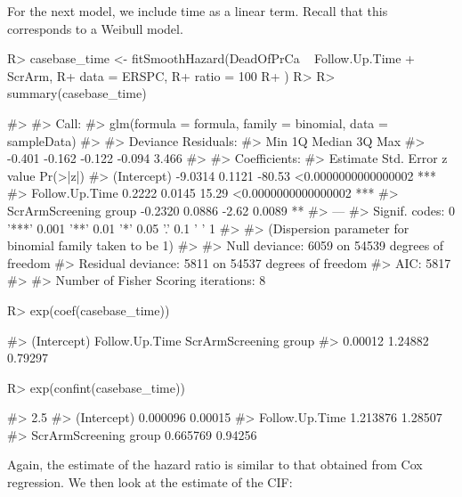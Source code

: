 \documentclass[
]{jss}
\begin{document}
For the next model, we include time as a linear term. Recall that this
corresponds to a Weibull model.

\begin{CodeChunk}

\begin{CodeInput}
R> casebase_time <- fitSmoothHazard(DeadOfPrCa ~ Follow.Up.Time + ScrArm,
R+   data = ERSPC,
R+   ratio = 100
R+ )
R> 
R> summary(casebase_time)
\end{CodeInput}

\begin{CodeOutput}
#> 
#> Call:
#> glm(formula = formula, family = binomial, data = sampleData)
#> 
#> Deviance Residuals: 
#>    Min      1Q  Median      3Q     Max  
#> -0.401  -0.162  -0.122  -0.094   3.466  
#> 
#> Coefficients:
#>                       Estimate Std. Error z value            Pr(>|z|)    
#> (Intercept)            -9.0314     0.1121  -80.53 <0.0000000000000002 ***
#> Follow.Up.Time          0.2222     0.0145   15.29 <0.0000000000000002 ***
#> ScrArmScreening group  -0.2320     0.0886   -2.62              0.0089 ** 
#> ---
#> Signif. codes:  0 '***' 0.001 '**' 0.01 '*' 0.05 '.' 0.1 ' ' 1
#> 
#> (Dispersion parameter for binomial family taken to be 1)
#> 
#>     Null deviance: 6059  on 54539  degrees of freedom
#> Residual deviance: 5811  on 54537  degrees of freedom
#> AIC: 5817
#> 
#> Number of Fisher Scoring iterations: 8
\end{CodeOutput}

\begin{CodeInput}
R> exp(coef(casebase_time))
\end{CodeInput}

\begin{CodeOutput}
#>           (Intercept)        Follow.Up.Time ScrArmScreening group 
#>               0.00012               1.24882               0.79297
\end{CodeOutput}

\begin{CodeInput}
R> exp(confint(casebase_time))
\end{CodeInput}

\begin{CodeOutput}
#>                          2.5 %
#> (Intercept)           0.000096 0.00015
#> Follow.Up.Time        1.213876 1.28507
#> ScrArmScreening group 0.665769 0.94256
\end{CodeOutput}
\end{CodeChunk}

Again, the estimate of the hazard ratio is similar to that obtained from
Cox regression. We then look at the estimate of the CIF:
\end{document}

